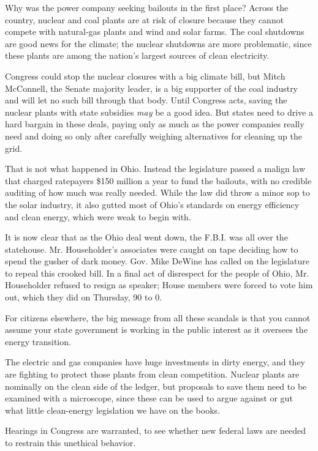 Why was the power company seeking bailouts in the first place? Across
the country, nuclear and coal plants are at risk of closure because they
cannot compete with natural-gas plants and wind and solar farms. The
coal shutdowns are good news for the climate; the nuclear shutdowns are
more problematic, since these plants are among the nation's largest
sources of clean electricity.

Congress could stop the nuclear closures with a big climate bill, but
Mitch McConnell, the Senate majority leader, is a big supporter of the
coal industry and will let no such bill through that body. Until
Congress acts, saving the nuclear plants with state subsidies \emph{may}
be a good idea. But states need to drive a hard bargain in these deals,
paying only as much as the power companies really need and doing so only
after carefully weighing alternatives for cleaning up the grid.

That is not what happened in Ohio. Instead the legislature passed a
malign law that charged ratepayers \$150 million a year to fund the
bailouts, with no credible auditing of how much was really needed. While
the law did throw a minor sop to the solar industry, it also gutted most
of Ohio's standards on energy efficiency and clean energy, which were
weak to begin with.

It is now clear that as the Ohio deal went down, the F.B.I. was all over
the statehouse. Mr. Householder's associates were caught on tape
deciding how to spend the gusher of dark money. Gov. Mike DeWine has
called on the legislature to repeal this crooked bill. In a final act of
disrespect for the people of Ohio, Mr. Householder refused to resign as
speaker; House members were forced to vote him out, which they did on
Thursday, 90 to 0.

For citizens elsewhere, the big message from all these scandals is that
you cannot assume your state government is working in the public
interest as it oversees the energy transition.

The electric and gas companies have huge investments in dirty energy,
and they are fighting to protect those plants from clean competition.
Nuclear plants are nominally on the clean side of the ledger, but
proposals to save them need to be examined with a microscope, since
these can be used to argue against or gut what little clean-energy
legislation we have on the books.

Hearings in Congress are warranted, to see whether new federal laws are
needed to restrain this unethical behavior.

